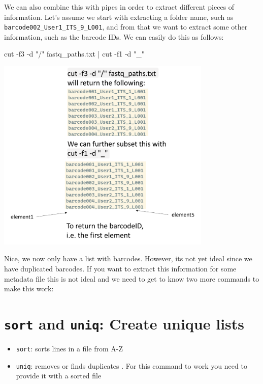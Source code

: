 \documentclass[
  letterpaper,
  DIV=11,
  numbers=noendperiod]{scrreprt}
\newenvironment{Shaded}{}{}
\newcommand{\AttributeTok}[1]{\textcolor[rgb]{0.84,0.23,0.29}{#1}}
\newcommand{\FunctionTok}[1]{\textcolor[rgb]{0.44,0.26,0.76}{#1}}
\newcommand{\KeywordTok}[1]{\textcolor[rgb]{0.84,0.23,0.29}{#1}}
\newcommand{\NormalTok}[1]{\textcolor[rgb]{0.14,0.16,0.18}{#1}}
\newcommand{\StringTok}[1]{\textcolor[rgb]{0.01,0.18,0.38}{#1}}
\providecommand{\tightlist}{%
  \setlength{\itemsep}{0pt}\setlength{\parskip}{0pt}}\usepackage{longtable,booktabs,array}
\begin{document}
We can also combine this with pipes in order to extract different pieces
of information. Let's assume we start with extracting a folder name,
such as \texttt{barcode002\_User1\_ITS\_9\_L001}, and from that we want
to extract some other information, such as the barcode IDs. We can
easily do this as follows:

\begin{Shaded}
\begin{Highlighting}[]
\FunctionTok{cut} \AttributeTok{{-}f3} \AttributeTok{{-}d} \StringTok{"/"}\NormalTok{ fastq\_paths.txt }\KeywordTok{|} \FunctionTok{cut} \AttributeTok{{-}f1} \AttributeTok{{-}d} \StringTok{"\_"}
\end{Highlighting}
\end{Shaded}

\includegraphics[width=4.04167in,height=\textheight]{../img/cut_2.png}

Nice, we now only have a list with barcodes. However, its not yet ideal
since we have duplicated barcodes. If you want to extract this
information for some metadata file this is not ideal and we need to get
to know two more commands to make this work:

\section{\texorpdfstring{\texttt{sort} and \texttt{uniq}: Create unique
lists}{sort and uniq: Create unique lists}}\label{sort-and-uniq-create-unique-lists}

\begin{itemize}
\tightlist
\item
  \texttt{sort}: sorts lines in a file from A-Z
\item
  \texttt{uniq}: removes or finds duplicates . For this command to work
  you need to provide it with a sorted file
\end{itemize}
\end{document}
